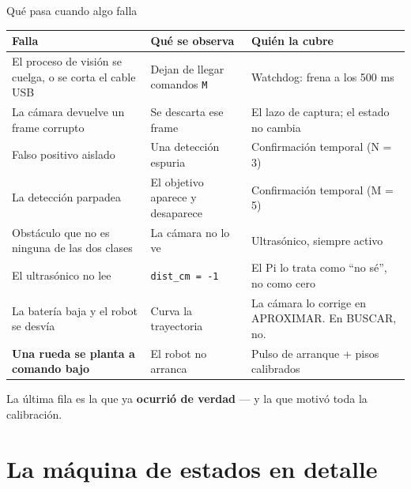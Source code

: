 \documentclass[aspectratio=169,10pt]{beamer}
\begin{document}
\begin{frame}{Qué pasa cuando algo falla}
  \scriptsize
  \begin{table}
    \begin{tabular}{@{}p{4.0cm}p{3.7cm}p{4.6cm}@{}}
      \toprule
      \textbf{Falla} & \textbf{Qué se observa} & \textbf{Quién la cubre} \\
      \midrule
      El proceso de visión se cuelga, o se corta el cable USB &
        Dejan de llegar comandos \texttt{M} &
        \textcolor{critico}{Watchdog}: frena a los 500 ms \\
      La cámara devuelve un frame corrupto & Se descarta ese frame &
        El lazo de captura; el estado no cambia \\
      Falso positivo aislado & Una detección espuria &
        \textcolor{azul}{Confirmación temporal} (N = 3) \\
      La detección parpadea & El objetivo aparece y desaparece &
        \textcolor{azul}{Confirmación temporal} (M = 5) \\
      Obstáculo que no es ninguna de las dos clases & La cámara no lo ve &
        \textcolor{gris}{Ultrasónico}, siempre activo \\
      El ultrasónico no lee & \texttt{dist\_cm = -1} &
        El Pi lo trata como ``no sé'', no como cero \\
      La batería baja y el robot se desvía & Curva la trayectoria &
        \textcolor{azul}{La cámara} lo corrige en APROXIMAR. En BUSCAR, no. \\
      \textbf{Una rueda se planta a comando bajo} & El robot no arranca &
        \textcolor{naranja}{Pulso de arranque} + pisos calibrados \\
      \bottomrule
    \end{tabular}
  \end{table}

  \vspace{0.3em}
  \centering
  La última fila es la que ya \textbf{ocurrió de verdad} --- y la que motivó toda
  la calibración.
\end{frame}

\section{La máquina de estados en detalle}
\end{document}
